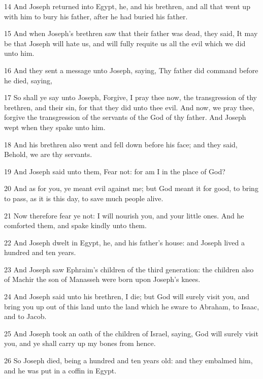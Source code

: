 \par 14 And Joseph returned into Egypt, he, and his brethren, and all that went up with him to bury his father, after he had buried his father.
\par 15 And when Joseph's brethren saw that their father was dead, they said, It may be that Joseph will hate us, and will fully requite us all the evil which we did unto him.
\par 16 And they sent a message unto Joseph, saying, Thy father did command before he died, saying,
\par 17 So shall ye say unto Joseph, Forgive, I pray thee now, the transgression of thy brethren, and their sin, for that they did unto thee evil. And now, we pray thee, forgive the transgression of the servants of the God of thy father. And Joseph wept when they spake unto him.
\par 18 And his brethren also went and fell down before his face; and they said, Behold, we are thy servants.
\par 19 And Joseph said unto them, Fear not: for am I in the place of God?
\par 20 And as for you, ye meant evil against me; but God meant it for good, to bring to pass, as it is this day, to save much people alive.
\par 21 Now therefore fear ye not: I will nourish you, and your little ones. And he comforted them, and spake kindly unto them.
\par 22 And Joseph dwelt in Egypt, he, and his father's house: and Joseph lived a hundred and ten years.
\par 23 And Joseph saw Ephraim's children of the third generation: the children also of Machir the son of Manasseh were born upon Joseph's knees.
\par 24 And Joseph said unto his brethren, I die; but God will surely visit you, and bring you up out of this land unto the land which he sware to Abraham, to Isaac, and to Jacob.
\par 25 And Joseph took an oath of the children of Israel, saying, God will surely visit you, and ye shall carry up my bones from hence.
\par 26 So Joseph died, being a hundred and ten years old: and they embalmed him, and he was put in a coffin in Egypt.


